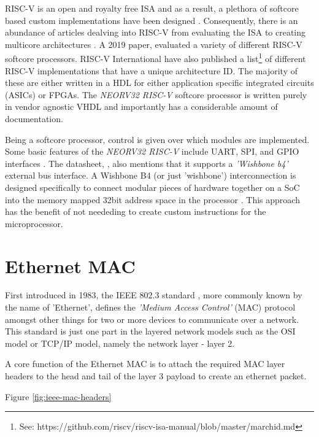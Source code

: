 RISC-V is an open and royalty free ISA and as a result, a plethora of softcore based custom implementations have been designed \cite{CatalogRISCSoftcore}. 
Consequently, there is an abundance of articles dealving into RISC-V from evaluating the ISA \cite{InvestigatingRiscv} to creating multicore architectures
\cite{RiscVMulticore}. A 2019 paper, \cite{CatalogRISCSoftcore} evaluated a variety of different RISC-V softcore processors. RISC-V International have 
also published a list\footnote[1]{See: https://github.com/riscv/riscv-isa-manual/blob/master/marchid.md} of different RISC-V implementations 
that have a unique architecture ID. The majority of these are either written in a HDL for either application specific integrated circuits (ASICs) or FPGAs.
The \textit{NEORV32 RISC-V} softcore processor is written purely in vendor agnostic VHDL and importantly has a considerable amount of documentation. 

Being a softcore processor, control is given over which modules are implemented. Some basic features of the \textit{NEORV32 RISC-V} include 
UART, SPI, and GPIO interfaces \cite{neorv32Datasheet}. The datasheet, \cite{neorv32Datasheet}, also mentions that it supports a \textit{'Wishbone b4'} 
external bus interface. A Wishbone B4 (or just 'wishbone') interconnection is designed specifically to connect modular pieces of hardware together on a 
SoC into the memory mapped 32bit address space in the processor \cite{WishboneSpec}. This approach has the benefit of not neededing to create custom 
instructions for the microprocessor. 

\newpage

\section{Ethernet MAC}

First introduced in 1983, the IEEE 802.3 standard \cite{IEEE802.3-2012}, more commonly known by the name of 'Ethernet', defines the \textit{'Medium Access Control'} 
(MAC) protocol amongst other things for two or more devices to communicate over a network. This standard is just one part in the layered network 
models such as the OSI model or TCP/IP model, namely the network layer - layer 2. 


A core function of the Ethernet MAC is to attach the required MAC layer headers to the head and tail of the layer 3 payload to create an ethernet packet.

Figure \ref{fig:ieee-mac-headers}


